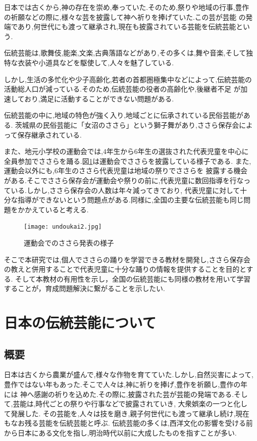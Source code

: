\documentclass[12pt]{ltjsarticle}
\begin{document}

日本では古くから,神の存在を崇め,奉っていた.そのため,祭りや地域の行事,豊作の祈願などの際に,様々な芸を披露して神へ祈りを捧げていた.この芸が芸能
の発端であり,何世代にも渡って継承され,現在も披露されている芸能を伝統芸能という.

伝統芸能は,歌舞伎,能楽,文楽,古典落語などがあり,その多くは,舞や音楽,そして独特な衣装や小道具などを駆使して,人々を魅了している.

しかし,生活の多忙化や少子高齢化,若者の首都圏極集中などによって,伝統芸能の活動総人口が減っている.そのため,伝統芸能の役者の高齢化や,後継者不足
が加速しており,満足に活動することができない問題がある.


伝統芸能の中に,地域の特色が強く入り,地域ごとに伝承されている民俗芸能がある.
茨城県の民俗芸能に「女沼のささら」という獅子舞があり,ささら保存会によって保存継承されている.




また、地元小学校の運動会では,4年生から6年生の選抜された代表児童を中心に全員参加でささらを踊る.図\ref{fig:運動会}は運動会でささらを披露している様子である.
また,運動会以外にも,6年生のささら代表児童は地域の祭りでささらを
披露する機会がある.そこでささら保存会が運動会や祭りの前に,代表児童に数回指導を行なっている.しかし,ささら保存会の人数は年々減ってきており,
代表児童に対して十分な指導ができないという問題点がある.同様に,全国の主要な伝統芸能も同じ問題をかかえていると考える.
\begin{figure}[h]
  \begin{center}
   \texttt{[image: undoukai2.jpg]}
  \end{center}
   \caption{運動会でのささら発表の様子}
   \label{fig:運動会}
  \end{figure}
  
そこで本研究では,個人でささらの踊りを学習できる教材を開発し,ささら保存会の教えと併用することで代表児童に十分な踊りの情報を提供することを目的とする.
そして本教材の有用性を示し，全国の伝統芸能にも同様の教材を用いて学習することが，育成問題解決に繋がることを示したい.

\newpage
\section{日本の伝統芸能について}

\subsection{概要}

日本は古くから農業が盛んで,様々な作物を育てていた.しかし,自然災害によって,豊作ではない年もあった.そこで人々は,神に祈りを捧げ,豊作を祈願し,豊作の年には
神へ感謝の祈りを込めた.その際に,披露された芸が芸能の発端である.そして,芸能は,時代ごとの祭りや行事などで披露されていき,
大衆娯楽の一つと化して発展した.
その芸能を,人々は技を磨き,親子何世代にも渡って継承し続け,現在もなお残る芸能を伝統芸能と呼ぶ.
伝統芸能の多くは,西洋文化の影響を受ける前から日本にある文化を指し,明治時代以前に大成したものを指すことが多い.
\end{document}
